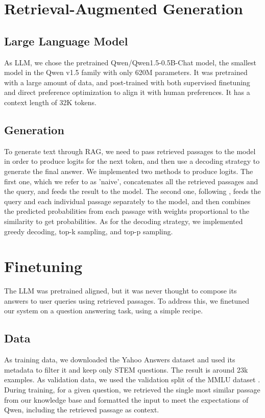\documentclass[11pt]{article}
\begin{document}
\section{Retrieval-Augmented Generation}

\subsection{Large Language Model}

As LLM, we chose the pretrained Qwen/Qwen1.5-0.5B-Chat \cite{qwen_hf} model, the smallest model in the Qwen v1.5 family
with only 620M parameters. It was pretrained with a large amount of data, and post-trained with both supervised finetuning 
and direct preference optimization to align it with human preferences. It has a context length of 32K tokens.

\subsection{Generation}

To generate text through RAG, we need to pass retrieved passages to the model in order to produce logits
for the next token, and then use a decoding strategy to generate the final answer.
We implemented two methods to produce logits. The first one, which we refer to as 'naive', concatenates all the retrieved passages
and the query, and feeds the result to the model. The second one, following \cite{replug}, feeds the query and each individual passage
separately to the model, and then combines the predicted probabilities from each passage with weights proportional to the similarity
to get probabilities.
As for the decoding strategy, we implemented greedy decoding, top-k sampling, and top-p sampling. \cite{decoding}

\section{Finetuning}

The LLM was pretrained aligned, but it was never thought to compose its answers to user queries using retrieved passages.
To address this, we finetuned our system on a question answering task, using a simple recipe.

\subsection{Data}

As training data, we downloaded the Yahoo Answers dataset and used its metadata to filter it and keep only STEM questions. The result is around 23k
examples. As validation data, we used the validation split of the MMLU dataset \cite{mmlu_hf}. During training, for a given question, we retrieved the single most similar passage from
our knowledge base and formatted the input to meet the expectations of Qwen, including the retrieved passage as context.
\end{document}
